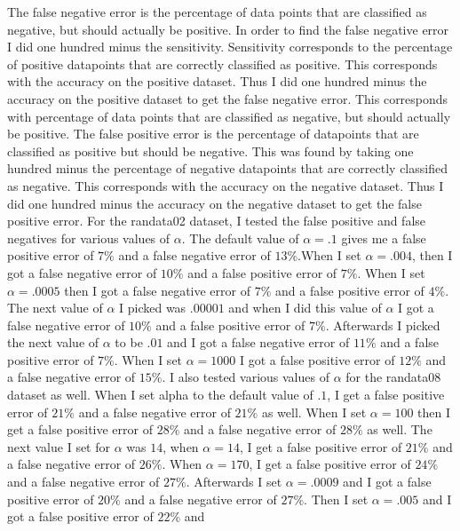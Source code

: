 \documentclass[11pt]{article}
\begin{document}
The false negative error is the percentage of data points that are classified as negative, but should
actually be positive. In order to find the false negative error I did one hundred minus the 
sensitivity. Sensitivity corresponds to the percentage of positive datapoints that are correctly 
classified 
as 
positive. This corresponds with the accuracy on the positive dataset. Thus I did one hundred minus the 
accuracy on 
the positive dataset to get the false negative error. This corresponds with percentage of data points 
that 
are classified as negative, but should
actually be positive. The false positive error is the 
percentage of 
datapoints that are classified
as positive but should be negative. This was found by taking one hundred minus the percentage of 
negative 
datapoints that are correctly classified 
as 
negative. This corresponds with the accuracy on the negative dataset. Thus I did one hundred minus the 
accuracy on 
the negative dataset to get the false positive error.
For the randata02 dataset, I tested the false positive and false 
negatives for 
various values of $
\alpha$. 
The default value of  $\alpha =.1$ gives me a false positive error of $7\%$ and a false negative error 
of
$13\%$.When I set $\alpha = .004$, then I got a false negative error of $10\%$ and a false positive 
error 
of $7\%$. When I set $\alpha = .0005$ then I got a false negative error of $7\%$ and a false positive 
error 
of $4\%$. The next value of $\alpha$ I picked was $.00001$ and when I did this value of $\alpha$ I got a 
false 
negative error of $10\%$ and a false positive error of $7\%$. Afterwards I picked the next value of $
\alpha
$ to be $.01$ and I got a false negative error of $11\%$ and a false positive error of $7\%$. When I set 
$\alpha = 1000$ I got a false positive error of $12\%$ and a false negative error of $15\%$. I also 
tested 
various values of $\alpha$ for the randata08 dataset as well. When I set alpha to the default value 
of $.1$, I get a false positive error of $21\%$ and a false negative error of $21\%$ as well. When I set
$\alpha = 100$ then I get a false positive error of $28\%$ and a false negative error of $28\%$ as well. 
The next value I set for $\alpha$ was $14$, when $\alpha = 14$, I get a false positive error of $21\%$ 
and 
a false negative error of $26\%$. When $\alpha = 170$, I get a false positive error of $24\%$ and a 
false 
negative error of $27\%$. Afterwards I set $\alpha =.0009$ and I got a false positive error of $20\%$ 
and 
a 
false negative error of $27\%$. Then I set $\alpha =.005$ and I got a false positive error of $22\%$ and 
\end{document}
